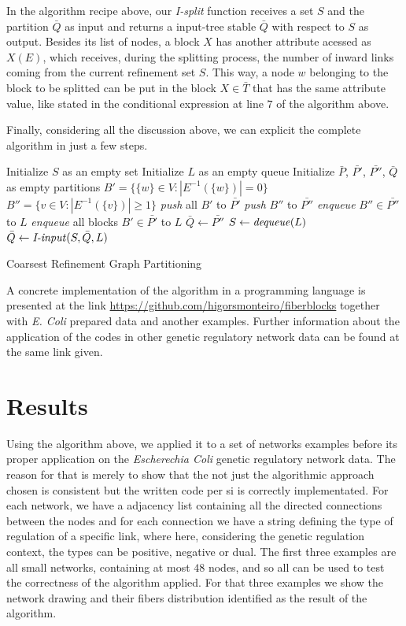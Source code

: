 \documentclass[12pt]{diazessay} %
\begin{document}
In the algorithm recipe above, our \textit{I-split} function receives a set $S$ and the partition $\bar{Q}$ as input and returns a input-tree stable $\bar{Q}$ with respect to $S$ as output. Besides its list of nodes, a block $X$ has another attribute acessed as $X(E)$, which receives, during the splitting process, the number of inward links coming from the current refinement set $S$. This way, a node $w$ belonging to the block to be splitted can be put in the block $X \in \bar{T}$ that has the same attribute value, like stated in the conditional expression at line $7$ of the algorithm above.

Finally, considering all the discussion above, we can explicit the complete algorithm in just a few steps.

\begin{algorithm}[h]
	\SetAlgoLined
	Initialize $S$ as an empty set\;
	Initialize $L$ as an empty queue\;
	Initialize $\bar{P}$, $\bar{P'}$, $\bar{P''}$, $\bar{Q}$ as empty partitions\;
	$B' = \{ \{ w \} \in V : |E^{-1}(\{w\})|=0 \}$\;
	$B'' = \{ v \in V : |E^{-1}(\{v\})| \geq 1 \}$\;
	\textit{push} all $B'$ to $\bar{P'}$\;
	\textit{push} $B''$ to $\bar{P''}$\;
	\textit{enqueue} $B'' \in \bar{P''}$ to $L$\;
	\textit{enqueue} all blocks $B' \in \bar{P'}$ to $L$\;
	$\bar{Q} \leftarrow \bar{P''}$\;
	{
		$S \leftarrow \text{\textit{dequeue}}(L)$\;
		$\bar{Q} \leftarrow \text{\textit{I-input}}(S, \bar{Q}, L)$
	}
	\caption{Coarsest Refinement Graph Partitioning}
\end{algorithm}

A concrete implementation of the algorithm in a programming language is presented at the link \url{https://github.com/higorsmonteiro/fiberblocks} together with \textit{E. Coli} prepared data and another examples. Further information about the application of the codes in other genetic regulatory network data can be found at the same link given.


\section*{Results}

Using the algorithm above, we applied it to a set of networks examples before its proper application on the \textit{Escherechia Coli} genetic regulatory network data. The reason for that is merely to show that the not just the algorithmic approach chosen is consistent but the written code per si is correctly implementated. For each network, we have a adjacency list containing all the directed connections between the nodes and for each connection we have a string defining the type of regulation of a specific link, where here, considering the genetic regulation context, the types can be positive, negative or dual. The first three examples are all small networks, containing at most $48$ nodes, and so all can be used to test the correctness of the algorithm applied. For that three examples we show the network drawing and their fibers distribution identified as the result of the algorithm.
\end{document}
